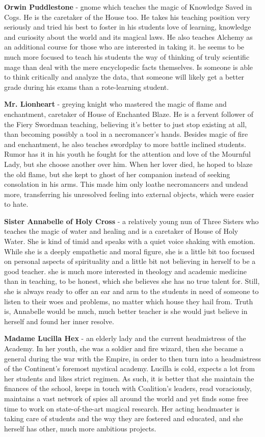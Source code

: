 \documentclass[a4paper,11pt]{article}
\begin{document}
\textbf{Orwin Puddlestone} - gnome which teaches the magic of Knowledge Saved in Cogs. He is the caretaker of the House too. He takes his teaching position very seriously and tried his best to foster in his students love of learning, knowledge and curiosity about the world and its magical laws. He also teaches Alchemy as an additional course for those who are interested in taking it. he seems to be much more focused to teach his students the way of thinking of truly scientific mage than deal with the mere encyclopedic facts themselves. Is someone is able to think critically and analyze the data, that someone will likely get a better grade during his exams than a rote-learning student. 

\textbf{Mr. Lionheart} - greying knight who mastered the magic of flame and enchantment, caretaker of House of Enchanted Blaze. He is a fervent follower of the Fiery Swordman teaching, believing it's better to just stop existing at all, than becoming possibly a tool in a necromancer's hands. Besides magic of fire and enchantment, he also teaches swordplay to more battle inclined students. Rumor has it in his youth he fought for the attention and love of the Mournful Lady, but she choose another over him. When her lover died, he hoped to blaze the old flame, but she kept to ghost of her companion instead of seeking consolation in his arms. This made him only loathe necromancers and undead more, transferring his unresolved feeling into external objects, which were easier to hate. 

\textbf{Sister Annabelle of Holy Cross} - a relatively young nun of Three Sisters who teaches the magic of water and healing and is a caretaker of House of Holy Water. She is kind of timid and speaks with a quiet voice shaking with emotion. While she is a deeply empathetic and moral figure, she is a little bit too focused on personal aspects of spirituality and a little bit not believing in herself to be a good teacher. she is much more interested in theology and academic medicine than in teaching, to be honest, which she believes she has no true talent for. Still, she is always ready to offer an ear and arm to the students in need of someone to listen to their woes and problems, no matter which house they hail from. Truth is, Annabelle would be much, much better teacher is she would just believe in herself and found her inner resolve.   

\textbf{Madame Lucilla Hex} - an elderly lady and the current headmistress of the Academy. In her youth, she was a soldier and fire wizard, then she became a general during the war with the Empire, in order to then turn into a headmistress of the Continent's foremost mystical academy. Lucilla is cold, expects a lot from her students and likes strict regimen. As such, it is better that she maintain the finances of the school, keeps in touch with Coalition's leaders, read voraciously, maintains a vast network of spies all around the world and yet finds some free time to work on state-of-the-art magical research. Her acting headmaster is taking care of students and the way they are fostered and educated, and she herself has other, much more ambitious projects. 
\end{document}
